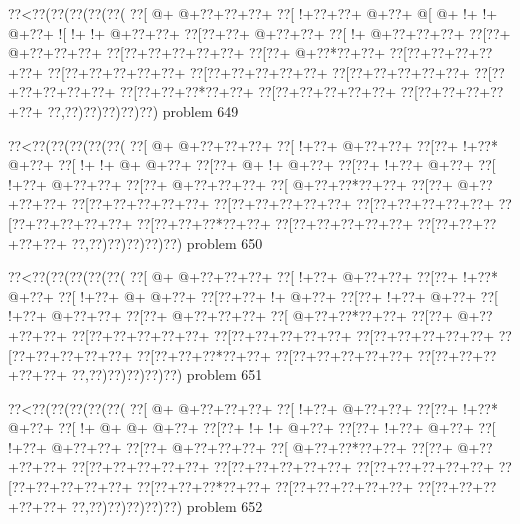 \vbox{\vbox{\goo
\0??<\0??(\0??(\0??(\0??(\0??(
\0??[\- @+\- @+\0??+\0??+\0??+
\0??[\- !+\0??+\0??+\- @+\0??+
\- @[\- @+\- !+\- !+\- @+\0??+
\- ![\- !+\- !+\- @+\0??+\0??+
\0??[\0??+\0??+\- @+\0??+\0??+
\0??[\- !+\- @+\0??+\0??+\0??+
\0??[\0??+\- @+\0??+\0??+\0??+
\0??[\0??+\0??+\0??+\0??+\0??+
\0??[\0??+\- @+\0??*\0??+\0??+
\0??[\0??+\0??+\0??+\0??+\0??+
\0??[\0??+\0??+\0??+\0??+\0??+
\0??[\0??+\0??+\0??+\0??+\0??+
\0??[\0??+\0??+\0??+\0??+\0??+
\0??[\0??+\0??+\0??+\0??+\0??+
\0??[\0??+\0??+\0??*\0??+\0??+
\0??[\0??+\0??+\0??+\0??+\0??+
\0??[\0??+\0??+\0??+\0??+\0??+
\0??,\0??)\0??)\0??)\0??)\0??)
}
\hfil problem 649\hfil\break
}

\vbox{\vbox{\goo
\0??<\0??(\0??(\0??(\0??(\0??(
\0??[\- @+\- @+\0??+\0??+\0??+
\0??[\- !+\0??+\- @+\0??+\0??+
\0??[\0??+\- !+\0??*\- @+\0??+
\0??[\- !+\- !+\- @+\- @+\0??+
\0??[\0??+\- @+\- !+\- @+\0??+
\0??[\0??+\- !+\0??+\- @+\0??+
\0??[\- !+\0??+\- @+\0??+\0??+
\0??[\0??+\- @+\0??+\0??+\0??+
\0??[\- @+\0??+\0??*\0??+\0??+
\0??[\0??+\- @+\0??+\0??+\0??+
\0??[\0??+\0??+\0??+\0??+\0??+
\0??[\0??+\0??+\0??+\0??+\0??+
\0??[\0??+\0??+\0??+\0??+\0??+
\0??[\0??+\0??+\0??+\0??+\0??+
\0??[\0??+\0??+\0??*\0??+\0??+
\0??[\0??+\0??+\0??+\0??+\0??+
\0??[\0??+\0??+\0??+\0??+\0??+
\0??,\0??)\0??)\0??)\0??)\0??)
}
\hfil problem 650\hfil\break
}

\vbox{\vbox{\goo
\0??<\0??(\0??(\0??(\0??(\0??(
\0??[\- @+\- @+\0??+\0??+\0??+
\0??[\- !+\0??+\- @+\0??+\0??+
\0??[\0??+\- !+\0??*\- @+\0??+
\0??[\- !+\0??+\- @+\- @+\0??+
\0??[\0??+\0??+\- !+\- @+\0??+
\0??[\0??+\- !+\0??+\- @+\0??+
\0??[\- !+\0??+\- @+\0??+\0??+
\0??[\0??+\- @+\0??+\0??+\0??+
\0??[\- @+\0??+\0??*\0??+\0??+
\0??[\0??+\- @+\0??+\0??+\0??+
\0??[\0??+\0??+\0??+\0??+\0??+
\0??[\0??+\0??+\0??+\0??+\0??+
\0??[\0??+\0??+\0??+\0??+\0??+
\0??[\0??+\0??+\0??+\0??+\0??+
\0??[\0??+\0??+\0??*\0??+\0??+
\0??[\0??+\0??+\0??+\0??+\0??+
\0??[\0??+\0??+\0??+\0??+\0??+
\0??,\0??)\0??)\0??)\0??)\0??)
}
\hfil problem 651\hfil\break
}

\vbox{\vbox{\goo
\0??<\0??(\0??(\0??(\0??(\0??(
\0??[\- @+\- @+\0??+\0??+\0??+
\0??[\- !+\0??+\- @+\0??+\0??+
\0??[\0??+\- !+\0??*\- @+\0??+
\0??[\- !+\- @+\- @+\- @+\0??+
\0??[\0??+\- !+\- !+\- @+\0??+
\0??[\0??+\- !+\0??+\- @+\0??+
\0??[\- !+\0??+\- @+\0??+\0??+
\0??[\0??+\- @+\0??+\0??+\0??+
\0??[\- @+\0??+\0??*\0??+\0??+
\0??[\0??+\- @+\0??+\0??+\0??+
\0??[\0??+\0??+\0??+\0??+\0??+
\0??[\0??+\0??+\0??+\0??+\0??+
\0??[\0??+\0??+\0??+\0??+\0??+
\0??[\0??+\0??+\0??+\0??+\0??+
\0??[\0??+\0??+\0??*\0??+\0??+
\0??[\0??+\0??+\0??+\0??+\0??+
\0??[\0??+\0??+\0??+\0??+\0??+
\0??,\0??)\0??)\0??)\0??)\0??)
}
\hfil problem 652\hfil\break
}

